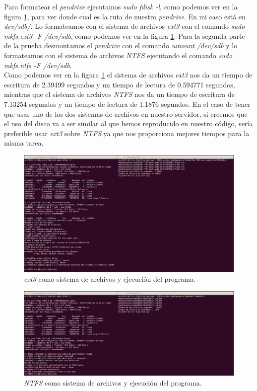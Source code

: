 \documentclass[a4paper,titlepage,12pt]{scrartcl}	%
\numberwithin{figure}{section} %
\numberwithin{table}{section} %
\begin{document}
	Para formatear el \textit{pendrive} ejecutamos \textit{sudo fdisk -l}, como podemos ver en la figura \ref{6-ext3}, para ver donde cual es la ruta de nuestro \textit{pendrive}. En mi caso está en \textit{dev/sdb/}. Lo formateamos con el sistema de archivos \textit{ext3} con el comando \textit{sudo mkfs.ext3 -F /dev/sdb}, como podemos ver en la figura \ref{6-ext3}. Para la segunda parte de la prueba desmontamos el \textit{pendrive} con el comando \textit{umount /dev/sdb} y lo formateamos con el sistema de archivos \textit{NTFS} ejecutando el comando \textit{sudo mkfs.ntfs -F /dev/sdb}. \\
	
	Como podemos ver en la figura \ref{6-ext3} el sistema de archivos \textit{ext3} nos da un tiempo de escritura de 2.39499 segundos y un tiempo de lectura de 0.594771 segundos, mientras que el sistema de archivos \textit{NTFS} nos da un tiempo de escritura de 7.13254 segundos y un tiempo de lectura de 1.1876 segundos. En el caso de tener que usar uno de los dos sistemas de archivos en nuestro servidor, si creemos que el uso del disco va a ser similar al que hemos reproducido en nuestro código, sería preferible usar \textit{ext3} sobre \textit{NTFS} ya que nos proporciona mejores tiempos para la misma tarea.
	
	\begin{figure}[H]
		\centering
		\includegraphics[width=\linewidth]{./Imagenes/6-ext3.png}
		\caption[\textit{ext3} como sistema de archivos y ejecución del programa.]{\textit{ext3} como sistema de archivos y ejecución del programa.}
		\label{6-ext3}
	\end{figure}
	
	\begin{figure}[H]
		\centering
		\includegraphics[width=\linewidth]{./Imagenes/6-ntfs.png}
		\caption[\textit{NTFS} como sistema de archivos y ejecución del programa.]{\textit{NTFS} como sistema de archivos y ejecución del programa.}
		\label{6-ntfs}
	\end{figure}
		
	\clearpage
	
	
\end{document}
